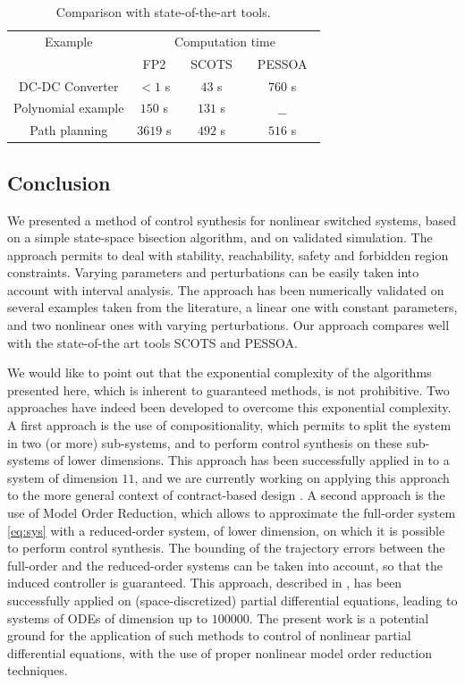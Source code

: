 \begin{table}[t]
  \centering
  \caption{Comparison with state-of-the-art tools.}
  \label{tab:SOTA}
  \begin{tabular}{|c|c|c|c|}
    \hline
    Example & \multicolumn{3}{c|}{Computation time} \\
    \cline{2-4} & ~FP2~ & ~SCOTS~ & ~PESSOA~   \\
    \hline
    DC-DC Converter & $< 1$ s &    $43$ s  &  $760$ s \\
    Polynomial example & $150$ s & $131$ s & $\_\_$  \\
    Path planning & $3619$ s & $492$ s & $516$ s \\
    \hline
  \end{tabular}
\end{table}


\subsection{Conclusion}
\label{sec:conclu}

We presented a method of control synthesis for nonlinear switched
systems, based on a simple state-space bisection algorithm, and on
validated simulation. The approach permits to deal with stability,
reachability, safety and forbidden region constraints. Varying
parameters and perturbations can be easily taken into account with
interval analysis. The approach has been numerically validated on
several examples taken from the literature, a linear one with constant
parameters, and two nonlinear ones with varying perturbations.  Our
approach compares well with the state-of-the art tools SCOTS and
PESSOA.

We would like to point out that the exponential complexity of the
algorithms presented here, which is inherent to guaranteed methods, is
not prohibitive. Two approaches have indeed been developed to overcome
this exponential complexity.  A first approach is the use of
compositionality, which permits to split the system in two (or more)
sub-systems, and to perform control synthesis on these sub-systems of
lower dimensions.  This approach has been successfully applied in
\cite{LeCoent2016} to a system of dimension $11$, and we are currently
working on applying this approach to the more general context of
contract-based design \cite{sangiovanni2012taming}.  A second approach
is the use of Model Order Reduction, which allows to approximate the
full-order system \eqref{eq:sys} with a reduced-order system, of lower
dimension, on which it is possible to perform control synthesis.  The
bounding of the trajectory errors between the full-order and the
reduced-order systems can be taken into account, so that the induced
controller is guaranteed. This approach, described in
\cite{le2016control}, has been successfully applied on
(space-discretized) partial differential equations, leading to systems
of ODEs of dimension up to $100 000$.  The present work is a potential
ground for the application of such methods to control of nonlinear
partial differential equations, with the use of proper nonlinear model
order reduction techniques.




